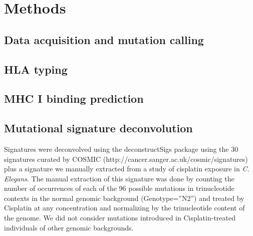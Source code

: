 \section*{Methods}
\subsection*{Data acquisition and mutation calling}

\subsection*{HLA typing}

\subsection*{MHC I binding prediction}



\subsection*{Mutational signature deconvolution}
Signatures were deconvolved using the deconstructSigs\cite{Rosenthal_2016} package using the 30 signatures curated by COSMIC (http://cancer.sanger.ac.uk/cosmic/signatures) plus a signature we manually extracted from a study of cisplatin exposure in \textit{C. Elegans}\cite{Meier_2014}. The manual extraction of this signature was done by counting the number of occurrences of each of the 96 possible mutations in trinucleotide contexts in the normal genomic background (Genotype=”N2”) and treated by Cisplatin at any concentration and normalizing by the trinucleotide content of the  genome. We did not consider mutations introduced in Cisplatin-treated individuals of other genomic backgrounds.
